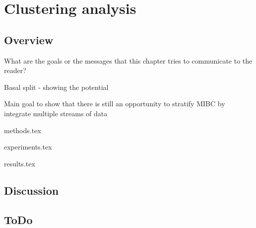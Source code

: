 \section{Clustering analysis} \label{s:clustering_analysis}

\subsection{Overview}

What are the goals or the messages that this chapter tries to communicate to the reader?
\begin{todolist}
    \item Basal split - showing the potential
    \item Main goal to show that there is still an opportunity to stratify MIBC by integrate multiple streams of data
\end{todolist}

{methods.tex}

{experiments.tex}

{results.tex}

\subsection{Discussion}

\newpage

\subsection{ToDo}
